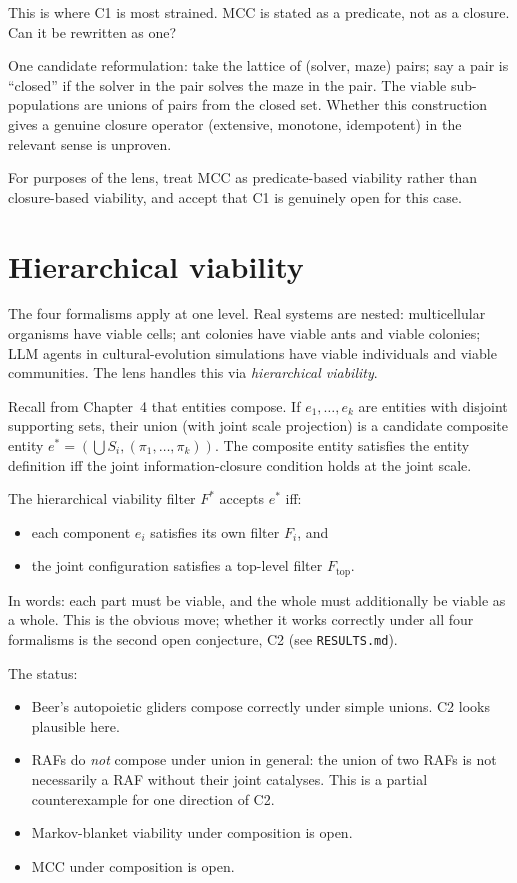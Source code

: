 This is where C1 is most strained. MCC is stated as a predicate, not
as a closure. Can it be rewritten as one?

One candidate reformulation: take the lattice of (solver, maze) pairs;
say a pair is ``closed'' if the solver in the pair solves the maze in
the pair. The viable sub-populations are unions of pairs from the
closed set. Whether this construction gives a genuine closure operator
(extensive, monotone, idempotent) in the relevant sense is unproven.

For purposes of the lens, treat MCC as predicate-based viability rather
than closure-based viability, and accept that C1 is genuinely open for
this case.

\section{Hierarchical viability}

The four formalisms apply at one level. Real systems are nested:
multicellular organisms have viable cells; ant colonies have viable
ants and viable colonies; LLM agents in cultural-evolution
simulations have viable individuals and viable communities. The lens
handles this via \emph{hierarchical viability}.

Recall from Chapter~4 that entities compose. If $e_1, \ldots, e_k$ are
entities with disjoint supporting sets, their union (with joint scale
projection) is a candidate composite entity $e^* = (\bigcup S_i,
(\pi_1, \ldots, \pi_k))$. The composite entity satisfies the entity
definition iff the joint information-closure condition holds at the
joint scale.

The hierarchical viability filter $F^*$ accepts $e^*$ iff:

\begin{itemize}[leftmargin=1.5em,itemsep=2pt]
  \item each component $e_i$ satisfies its own filter $F_i$, and
  \item the joint configuration satisfies a top-level filter
    $F_{\mathrm{top}}$.
\end{itemize}

In words: each part must be viable, and the whole must additionally be
viable as a whole. This is the obvious move; whether it works
correctly under all four formalisms is the second open conjecture, C2
(see \texttt{RESULTS.md}).

The status:

\begin{itemize}[leftmargin=1.5em,itemsep=2pt]
  \item Beer's autopoietic gliders compose correctly under simple
    unions. C2 looks plausible here.
  \item RAFs do \emph{not} compose under union in general: the union
    of two RAFs is not necessarily a RAF without their joint
    catalyses. This is a partial counterexample for one direction of
    C2.
  \item Markov-blanket viability under composition is open.
  \item MCC under composition is open.
\end{itemize}

